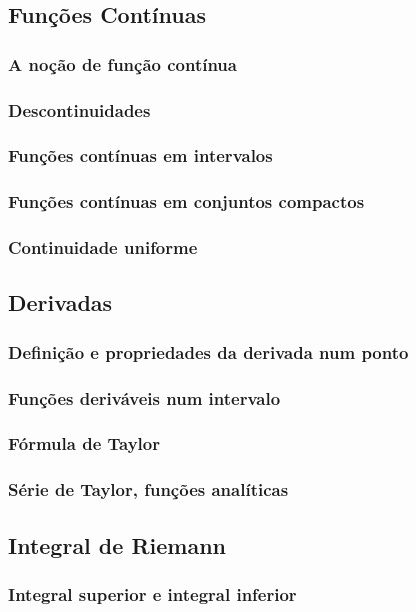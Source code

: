 \documentclass{article}
\theoremstyle{theorem}
\theoremstyle{lemma}
\theoremstyle{definition}
\theoremstyle{remark}
\begin{document}
\subsection{ Funções Contínuas}
   \subsubsection{ A noção de função contínua}
   \subsubsection{ Descontinuidades}
   \subsubsection{ Funções contínuas em intervalos}
   \subsubsection{ Funções contínuas em conjuntos compactos}
   \subsubsection{ Continuidade uniforme}
\subsection{ Derivadas}
   \subsubsection{ Definição e propriedades da derivada num ponto}
   \subsubsection{ Funções deriváveis num intervalo}
   \subsubsection{ Fórmula de Taylor}
   \subsubsection{ Série de Taylor, funções analíticas}
\subsection{ Integral de Riemann}
   \subsubsection{ Integral superior e integral inferior}
\end{document}
